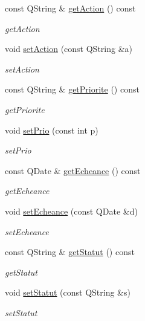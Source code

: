 \begin{DoxyCompactItemize}
\item 
const Q\+String \& \hyperlink{class_tache_ab3a169e6dca3ea536cf2ae17e463a133}{get\+Action} () const
\begin{DoxyCompactList}\small\item\em get\+Action \end{DoxyCompactList}\item 
void \hyperlink{class_tache_a8b7080efc2f5075567118e22853282b3}{set\+Action} (const Q\+String \&a)
\begin{DoxyCompactList}\small\item\em set\+Action \end{DoxyCompactList}\item 
const Q\+String \& \hyperlink{class_tache_a4bed6af48b1173ab0c4fe7a51caf74c7}{get\+Priorite} () const
\begin{DoxyCompactList}\small\item\em get\+Priorite \end{DoxyCompactList}\item 
void \hyperlink{class_tache_ac01f5924c53c6a5dec03d97fdf1b9372}{set\+Prio} (const int p)
\begin{DoxyCompactList}\small\item\em set\+Prio \end{DoxyCompactList}\item 
const Q\+Date \& \hyperlink{class_tache_a46cce7b1275ef98bb4aa49d94cdf56e5}{get\+Echeance} () const
\begin{DoxyCompactList}\small\item\em get\+Echeance \end{DoxyCompactList}\item 
void \hyperlink{class_tache_aeb146678e67bc96eb421333f7945ce67}{set\+Echeance} (const Q\+Date \&d)
\begin{DoxyCompactList}\small\item\em set\+Echeance \end{DoxyCompactList}\item 
const Q\+String \& \hyperlink{class_tache_a70f9118ba2f80374b8eae2cc0bda2f42}{get\+Statut} () const
\begin{DoxyCompactList}\small\item\em get\+Statut \end{DoxyCompactList}\item 
void \hyperlink{class_tache_a74f48736fded309666abe8bc419d6215}{set\+Statut} (const Q\+String \&s)
\begin{DoxyCompactList}\small\item\em set\+Statut \end{DoxyCompactList}\item 

\end{DoxyCompactItemize}
